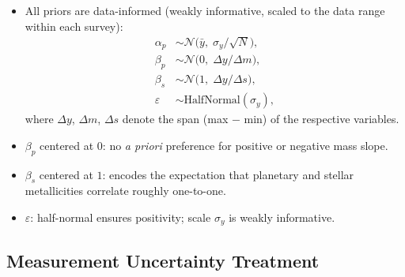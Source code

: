 \documentclass[twocolumn]{aastex631}
\begin{document}
\begin{itemize}
    \item All priors are data-informed (weakly informative, scaled to
          the data range within each survey):
    \begin{align}
        \alpha_p &\sim \mathcal{N}\!\bigl(\bar{y},\;
                      \sigma_y / \sqrt{N}\bigr),
                      \label{eq:prior_alpha} \\
        \beta_p  &\sim \mathcal{N}\!\bigl(0,\;
                      \Delta y / \Delta m\bigr),
                      \label{eq:prior_betap} \\
        \beta_s  &\sim \mathcal{N}\!\bigl(1,\;
                      \Delta y / \Delta s\bigr),
                      \label{eq:prior_betas} \\
        \varepsilon &\sim \mathrm{HalfNormal}(\sigma_y),
                      \label{eq:prior_eps}
    \end{align}
    where $\Delta y$, $\Delta m$, $\Delta s$ denote the span
    (max $-$ min) of the respective variables.
    \item $\beta_p$ centered at $0$: no \emph{a priori}
          preference for positive or negative mass slope.
    \item $\beta_s$ centered at $1$: encodes the expectation that
          planetary and stellar metallicities correlate roughly
          one-to-one.
    \item $\varepsilon$: half-normal ensures positivity;
          scale $\sigma_y$ is weakly informative.
\end{itemize}

\subsection{Measurement Uncertainty Treatment}\label{sec:errors}
\end{document}
